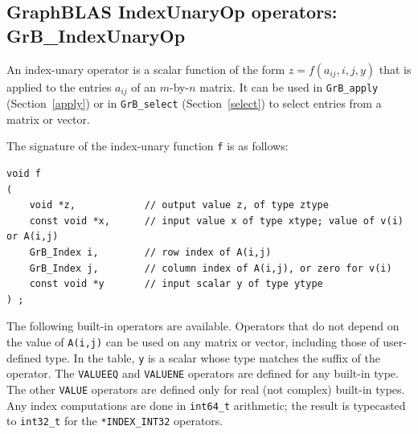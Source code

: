 
\newpage
\subsection{GraphBLAS IndexUnaryOp operators: {\sf GrB\_IndexUnaryOp}} %
\label{idxunop}

An index-unary operator is a scalar function of the form
$z=f(a_{ij},i,j,y)$ that is applied to the entries $a_{ij}$ of an
$m$-by-$n$ matrix.  It can be used in \verb'GrB_apply' (Section~\ref{apply}) or
in \verb'GrB_select' (Section~\ref{select}) to select entries from a matrix or
vector.

The signature of the index-unary function \verb'f' is as follows:

{\footnotesize
\begin{verbatim}
void f
(
    void *z,            // output value z, of type ztype
    const void *x,      // input value x of type xtype; value of v(i) or A(i,j)
    GrB_Index i,        // row index of A(i,j)
    GrB_Index j,        // column index of A(i,j), or zero for v(i)
    const void *y       // input scalar y of type ytype
) ; \end{verbatim}}

The following built-in operators are available.  Operators that do not depend
on the value of \verb'A(i,j)' can be used on any matrix or vector, including
those of user-defined type.  In the table, \verb'y' is a
scalar whose type matches the suffix of the operator.  The \verb'VALUEEQ' and
\verb'VALUENE' operators are defined for any built-in type. The other
\verb'VALUE' operators are defined only for real (not complex) built-in types.
Any index computations are done in \verb'int64_t' arithmetic; the result is
typecasted to \verb'int32_t' for the \verb'*INDEX_INT32' operators.

